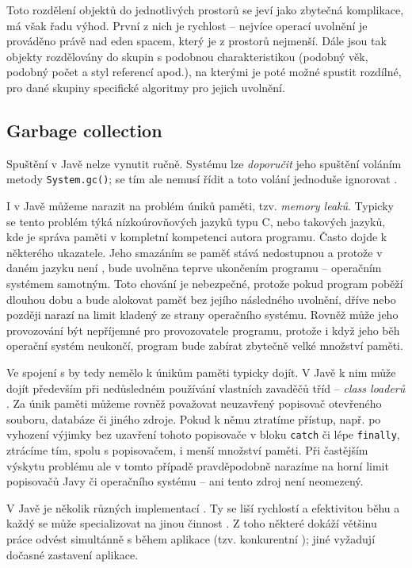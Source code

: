 Toto rozdělení objektů do jednotlivých prostorů se jeví jako zbytečná komplikace, má však řadu výhod. První z nich je rychlost – nejvíce operací uvolnění je prováděno právě nad eden spacem, který je z prostorů nejmenší. Dále jsou tak objekty rozdělovány do skupin s podobnou charakteristikou (podobný věk, podobný počet a styl referencí apod.), na kterými je poté možné spustit rozdílné, pro dané skupiny specifické algoritmy pro jejich uvolnění.

\subsection{Garbage collection}
	Spuštění  v Javě nelze vynutit ručně. Systému lze \textit{doporučit} jeho spuštění voláním metody \texttt{System.gc()};  se tím ale nemusí řídit a toto volání jednoduše ignorovat \cite{javagc}. 

I v Javě můžeme narazit na problém úniků paměti, tzv. \textit{memory leaků}. Typicky se tento problém týká nízkoúrovňových jazyků typu C, nebo takových jazyků, kde je správa paměti v kompletní kompetenci autora programu. Často dojde k  některého ukazatele. Jeho smazáním se paměť stává nedostupnou a protože v daném jazyku není , bude uvolněna teprve ukončením programu -- operačním systémem samotným. Toto chování je nebezpečné, protože pokud program poběží dlouhou dobu a bude alokovat paměť bez jejího následného uvolnění, dříve nebo později narazí na limit kladený ze strany operačního systému. Rovněž může jeho provozování být nepříjemné pro provozovatele programu, protože i když jeho běh operační systém neukončí, program bude zabírat zbytečně velké množství paměti.

Ve spojení s  by tedy nemělo k únikům paměti typicky dojít. V Javě k nim může dojít především při nedůsledném používání vlastních zavaděčů tříd -- \textit{class loaderů} \cite{classloader-memory-leak}. Za únik paměti můžeme rovněž považovat neuzavřený popisovač otevřeného souboru, databáze či jiného zdroje. Pokud k němu ztratíme přístup, např. po vyhození výjimky bez uzavření tohoto popisovače v bloku \texttt{catch} či lépe \texttt{finally}, ztrácíme tím, spolu s popisovačem, i menší množství paměti. Při častějším výskytu problému ale v tomto případě pravděpodobně narazíme na horní limit popisovačů Javy či operačního systému -- ani tento zdroj není neomezený.

V Javě je několik různých implementací . Ty se liší rychlostí a efektivitou běhu a každý se může specializovat na jinou činnost \cite{gc-details}. Z toho některé  dokáží většinu práce odvést simultánně s během aplikace (tzv. konkurentní ); jiné vyžadují dočasné zastavení aplikace.

